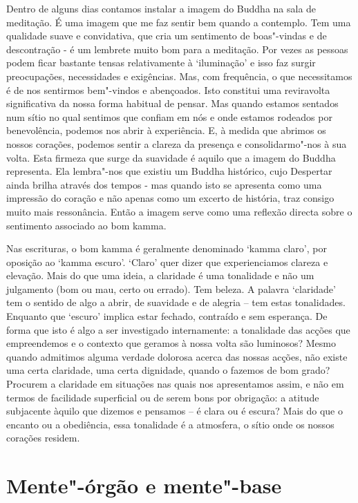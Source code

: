 Dentro de alguns dias contamos instalar a imagem do Buddha na sala de meditação.
É uma imagem que me faz sentir bem quando a contemplo. Tem uma qualidade suave e
convidativa, que cria um sentimento de boas"-vindas e de descontração - é um
lembrete muito bom para a meditação. Por vezes as pessoas podem ficar bastante
tensas relativamente à `iluminação' e isso faz surgir preocupações, necessidades
e exigências. Mas, com frequência, o que necessitamos é de nos sentirmos
bem"-vindos e abençoados. Isto constitui uma reviravolta significativa da nossa
forma habitual de pensar. Mas quando estamos sentados num sítio no qual sentimos
que confiam em nós e onde estamos rodeados por benevolência, podemos nos abrir à
experiência. E, à medida que abrimos os nossos corações, podemos sentir a
clareza da presença e consolidarmo"-nos à sua volta. Esta firmeza que surge da
suavidade é aquilo que a imagem do Buddha representa. Ela lembra"-nos que existiu
um Buddha histórico, cujo Despertar ainda brilha através dos tempos - mas quando
isto se apresenta como uma impressão do coração e não apenas como um excerto de
história, traz consigo muito mais ressonância. Então a imagem serve como uma
reflexão directa sobre o sentimento associado ao bom kamma.

Nas escrituras, o bom kamma é geralmente denominado `kamma claro', por oposição
ao `kamma escuro'. `Claro' quer dizer que experienciamos clareza e elevação.
Mais do que uma ideia, a claridade é uma tonalidade e não um julgamento (bom ou
mau, certo ou errado). Tem beleza. A palavra `claridade' tem o sentido de algo a
abrir, de suavidade e de alegria -- tem estas tonalidades. Enquanto que `escuro'
implica estar fechado, contraído e sem esperança. De forma que isto é algo a ser
investigado internamente: a tonalidade das acções que empreendemos e o contexto
que geramos à nossa volta são luminosos? Mesmo quando admitimos alguma verdade
dolorosa acerca das nossas acções, não existe uma certa claridade, uma certa
dignidade, quando o fazemos de bom grado? Procurem a claridade em situações nas
quais nos apresentamos assim, e não em termos de facilidade superficial ou de
serem bons por obrigação: a atitude subjacente àquilo que dizemos e pensamos --
é clara ou é escura? Mais do que o encanto ou a obediência, essa tonalidade é a
atmosfera, o sítio onde os nossos corações residem.

\section{Mente"-órgão e mente"-base}

